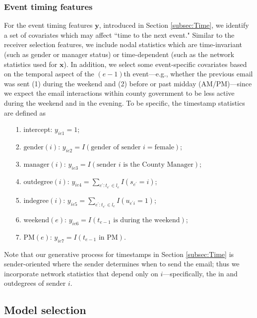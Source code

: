 \documentclass[ba]{imsart}
\numberwithin{equation}{section}
\theoremstyle{plain}
\begin{document}
	\subsubsection{Event timing features}
For the event timing features $\boldsymbol{y}$, introduced in Section \ref{subsec:Time}, we identify a set of covariates which may affect ``time to the next event." Similar to the receiver selection features, we include nodal statistics which are time-invariant (such as gender or manager status) or time-dependent (such as the network statistics used for $\boldsymbol{x}$). In addition, we select some event-specific covariates based on the temporal aspect of the $(e-1)$th event---e.g., whether the previous email was sent (1) during the weekend and (2) before or past midday (AM/PM)---since we expect the email interactions within county government to be less active during the weekend and in the evening. To be specific, the timestamp statistics are defined as
	\begin{itemize}
		\item[1.] intercept: ${y}_{ie1} =1$;
		\item[2.] $\mbox{gender}(i)$: ${y}_{ie2}=I(\mbox{gender of sender }i= \mbox{female})$;
		\item[3.] $\mbox{manager}(i)$: ${y}_{ie3}=I(\mbox{sender }i \mbox{ is the County Manager})$;
		\item[4.] $\mbox{outdegree}(i)$: ${y}_{ie4} =\sum_{e^\prime: t_{e^\prime} \in l_e} I(s_{e^\prime} = i)$;
		\item[5.] $\mbox{indegree}(i)$: ${y}_{ie5}=\sum_{e^\prime: t_{e^\prime} \in l_e} I(u_{e^\prime i} = 1)$;
		\item[6.] $\mbox{weekend}(e)$: ${y}_{ie6} = I(t_{e-1} \mbox{ is during the } \mbox{weekend})$;
		\item[7.] $\mbox{PM}(e)$: ${y}_{ie7}= I(t_{e-1} \mbox{ in } \mbox{PM})$.
	\end{itemize}
	Note that our generative process for timestamps in Section \ref{subsec:Time} is sender-oriented where the sender determines when to send the email; thus we incorporate network statistics that depend only on $i$---specifically, the in and outdegrees of sender $i$. 
	
	\subsection{Model selection}\label{subsec:Experiment_email}
	
\end{document}
